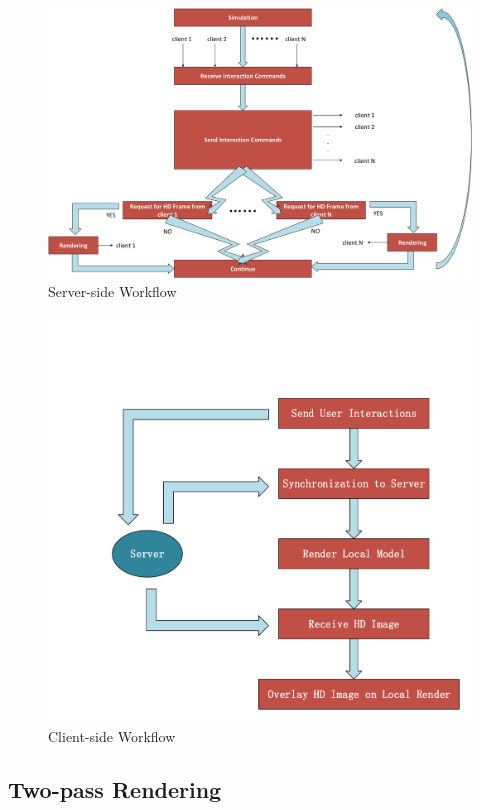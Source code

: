 \begin{figure}[!htbp]
	\includegraphics[width=\textwidth]{figures/workflow_server-eps-converted-to.pdf}
	\caption{Server-side Workflow}
	\label{fig:s-wf}
\end{figure}

\begin{figure}[!htbp]
	\includegraphics[width=\textwidth]{figures/workflow_client.pdf}
	\caption{Client-side Workflow}
	\label{fig:c-wf}
\end{figure}

\subsection{Two-pass Rendering}
\label{sec:hrr:m:tr}

